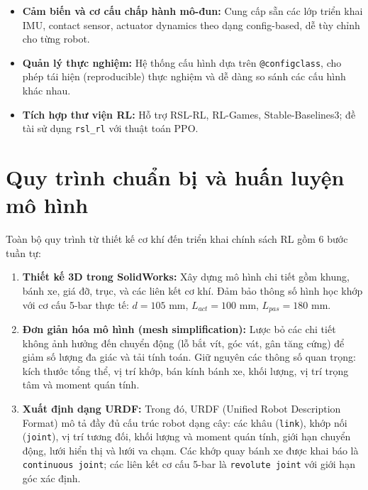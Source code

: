 \begin{itemize}
\begin{itemize}
    \item \textbf{Cảm biến và cơ cấu chấp hành mô-đun:} Cung cấp sẵn các lớp
    triển khai IMU, contact sensor, actuator dynamics theo dạng config-based,
    dễ tùy chỉnh cho từng robot.

    \item \textbf{Quản lý thực nghiệm:} Hệ thống cấu hình dựa trên
    \texttt{@configclass}, cho phép tái hiện (reproducible) thực nghiệm và
    dễ dàng so sánh các cấu hình khác nhau.

    \item \textbf{Tích hợp thư viện RL:} Hỗ trợ RSL-RL, RL-Games,
    Stable-Baselines3; đề tài sử dụng \texttt{rsl\_rl} với thuật toán PPO.
\end{itemize}


\section{Quy trình chuẩn bị và huấn luyện mô hình}

Toàn bộ quy trình từ thiết kế cơ khí đến triển khai chính sách RL gồm
6 bước tuần tự:

\begin{enumerate}

    \item \textbf{Thiết kế 3D trong SolidWorks:}
    Xây dựng mô hình chi tiết gồm khung, bánh xe, giá đỡ, trục, và các
    liên kết cơ khí. Đảm bảo thông số hình học khớp với cơ cấu 5-bar
    thực tế: $d = 105$ mm, $L_{act} = 100$ mm, $L_{pas} = 180$ mm.

    \item \textbf{Đơn giản hóa mô hình (mesh simplification):}
    Lược bỏ các chi tiết không ảnh hưởng đến chuyển động (lỗ bắt vít,
    góc vát, gân tăng cứng) để giảm số lượng đa giác và tải tính toán.
    Giữ nguyên các thông số quan trọng: kích thước tổng thể, vị trí khớp,
    bán kính bánh xe, khối lượng, vị trí trọng tâm và moment quán tính.

    \item \textbf{Xuất định dạng URDF:} Trong đó, 
    URDF (Unified Robot Description Format) mô tả đầy đủ cấu trúc robot
    dạng cây: các khâu (\texttt{link}), khớp nối (\texttt{joint}), vị trí
    tương đối, khối lượng và moment quán tính, giới hạn chuyển động, lưới
    hiển thị và lưới va chạm. Các khớp quay bánh xe được khai báo là
    \texttt{continuous joint}; các liên kết cơ cấu 5-bar là \texttt{revolute
    joint} với giới hạn góc xác định.


\end{enumerate}
\end{itemize}
